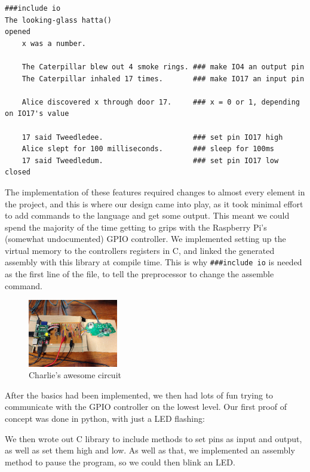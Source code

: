 \documentclass[11pt, notitlepage]{report}
\begin{document}
\begin{verbatim}
###include io
The looking-glass hatta()
opened
    x was a number.

    The Caterpillar blew out 4 smoke rings. ### make IO4 an output pin
    The Caterpillar inhaled 17 times.       ### make IO17 an input pin

    Alice discovered x through door 17.     ### x = 0 or 1, depending on IO17's value

    17 said Tweedledee.                     ### set pin IO17 high
    Alice slept for 100 milliseconds.       ### sleep for 100ms
    17 said Tweedledum.                     ### set pin IO17 low
closed
\end{verbatim}

The implementation of these features required changes to almost every element in the project, and this is where our design came into play, as it took minimal effort to add commands to the language and get some output. This meant we could spend the majority of the time getting to grips with the Raspberry Pi's (somewhat undocumented) GPIO controller. We implemented setting up the virtual memory to the controllers registers in C, and linked the generated assembly with this library at compile time. This is why \texttt{\#\#\#include io} is needed as the first line of the file, to tell the preprocessor to change the assemble command.

\begin{figure}
  \vspace{-20pt}
  \begin{center}
    \includegraphics[width=0.35\textwidth]{IMG_9457.JPG}
    \caption{Charlie's awesome circuit}
  \end{center}
  \vspace{-10pt}
\end{figure}
After the basics had been implemented, we then had lots of fun trying to communicate with the GPIO controller on the lowest level. Our first proof of concept was done in python, with just a LED flashing:

We then wrote out C library to include methods to set pins as input and output, as well as set them high and low. As well as that, we implemented an assembly method to pause the program, so we could then blink an LED.
\end{document}

